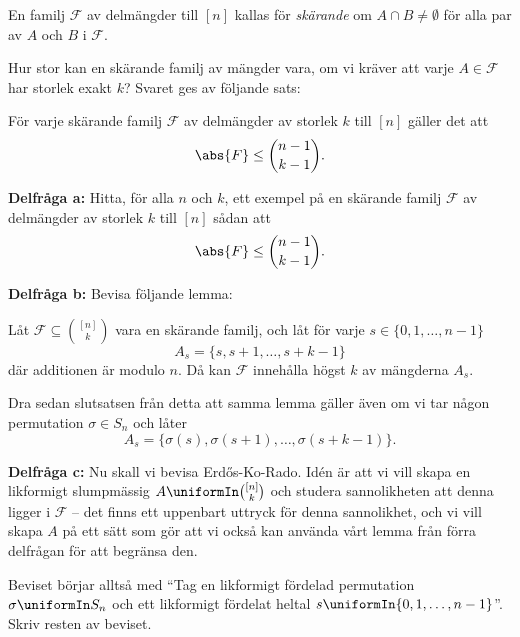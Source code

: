 \documentclass[nobib]{tufte-handout}
\begin{document}
\begin{xca}
    \begin{definition}
        En familj $\mathcal{F}$ av delmängder till $[n]$ kallas för \emph{skärande} om $A \cap B \neq \emptyset$ för alla par av $A$ och $B$ i $\mathcal{F}$.
    \end{definition}

    Hur stor kan en skärande familj av mängder vara, om vi kräver att varje $A \in \mathcal{F}$ har storlek exakt $k$? Svaret ges av följande sats:

    \begin{theorem}
        För varje skärande familj $\mathcal{F}$ av delmängder av storlek $k$ till $[n]$ gäller det att
        $$\abs{F} \leq \binom{n-1}{k-1}.$$
    \end{theorem}

    \textbf{Delfråga a:} Hitta, för alla $n$ och $k$, ett exempel på en skärande familj $\mathcal{F}$ av delmängder av storlek $k$ till $[n]$ sådan att
    $$\abs{F} \leq \binom{n-1}{k-1}.$$

    \textbf{Delfråga b:} Bevisa följande lemma:

    \begin{lemma}
        Låt $\mathcal{F} \subseteq \binom{[n]}{k}$ vara en skärande familj, och låt för varje $s \in \{0,1,\ldots,n-1\}$
        $$A_s = \{s, s+1, \ldots, s + k - 1\}$$
        där additionen är modulo $n$. Då kan $\mathcal{F}$ innehålla högst $k$ av mängderna $A_s$.
    \end{lemma}

    Dra sedan slutsatsen från detta att samma lemma gäller även om vi tar någon permutation $\sigma \in S_n$ och låter
    $$A_s = \{\sigma(s), \sigma(s+1), \ldots, \sigma(s + k - 1)\}.$$

    \textbf{Delfråga c:} Nu skall vi bevisa Erd\H{o}s-Ko-Rado. Idén är att vi vill skapa en likformigt slumpmässig $A \uniformIn \binom{[n]}{k}$ och studera sannolikheten att denna ligger i $\mathcal{F}$ -- det finns ett uppenbart uttryck för denna sannolikhet, och vi vill skapa $A$ på ett sätt som gör att vi också kan använda vårt lemma från förra delfrågan för att begränsa den.

    Beviset börjar alltså med ``Tag en likformigt fördelad permutation $\sigma \uniformIn S_n$ och ett likformigt fördelat heltal $s \uniformIn \{0,1,\ldots,n-1\}$''. Skriv resten av beviset.
\end{xca}
\end{document}
